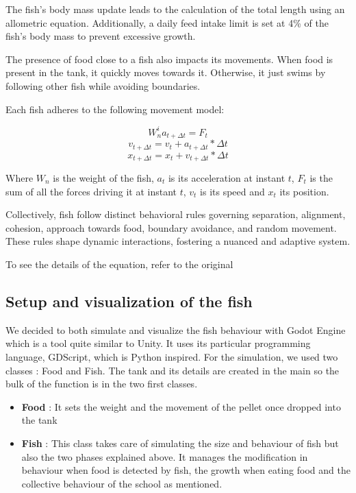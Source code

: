 \documentclass[9pt]{pnas-new}
\begin{document}
The fish's body mass update leads to the calculation of the total length using an allometric equation. Additionally, a daily feed intake limit is set at 4\% of the fish's body mass to prevent excessive growth.

The presence of food close to a fish also impacts its movements. When food is present in the tank, it quickly moves towards it. Otherwise, it just swims by following other fish while avoiding boundaries.

Each fish adheres to the following movement model:

\[W_n^i a_{t+\Delta t} = F_t\]
\[v_{t+\Delta t} = v_t +  a_{t+\Delta t}*\Delta t\]
\[x_{t+\Delta t} = x_t + v_{t+\Delta t} *\Delta t\]

Where $W_n$ is the weight of the fish, $a_t$ is its acceleration at instant $t$, $F_t$ is the sum of all the forces driving it at instant $t$, $v_t$ is its speed and $x_t$ its position.

Collectively, fish follow distinct behavioral rules governing separation, alignment, cohesion, approach towards food, boundary avoidance, and random movement. These rules shape dynamic interactions, fostering a nuanced and adaptive system.

To see the details of the equation, refer to the original \cite{article}

\subsection{Setup and visualization of the fish}
We decided to both simulate and visualize the fish behaviour with Godot Engine which is a tool quite similar to Unity. It uses its particular programming language, GDScript, which is Python inspired. For the simulation, we used two classes : Food and Fish. The tank and its details are created in the main so the bulk of the function is in the two first classes.

\begin{itemize}
    \item \textbf{Food} : It sets the weight and the movement of the pellet once dropped into the tank
    \item \textbf{Fish} : This class takes care of simulating the size and behaviour of fish but also the two phases explained above. It manages the modification in behaviour when food is detected by fish, the growth when eating food and the collective behaviour of the school as mentioned.
\end{itemize}   
\end{document}
